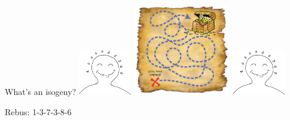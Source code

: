 \documentclass{beamer}
\begin{document}
\begin{frame}{What's an isogeny?}
  \centering
  \includegraphics[height=2cm]{ec-happy}
  \hfill
  \includegraphics[height=4cm]{map}
  \hfill
  \includegraphics[height=2cm]{ec-happy}

  \bigskip
  \Large Rebus: 1-3-7-3-8-6
\end{frame}

\end{document}
